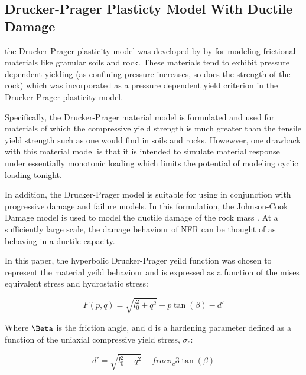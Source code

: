 \subsection{Drucker-Prager Plasticty Model With Ductile Damage}

the Drucker-Prager plasticity model was developed by by \citet{drucker_implications_1950} for modeling frictional materials like granular soils and rock. These materials tend  to exhibit pressure dependent yielding (as confining
pressure increases, so does the strength of the rock) which was incorporated as a pressure dependent yield criterion in the Drucker-Prager plasticity model. 

Specifically, the Drucker-Prager material model is formulated and used for materials of which the compressive yield strength is much greater than the tensile yield strength such as one would find in soils and rocks. Howewver, one drawback with this material model is that it is intended to simulate material response under essentially monotonic loading which limits the potential of modeling cyclic loading tonight.

In addition, the Drucker-Prager model is suitable for using in conjunction with progressive damage and failure models. In this formulation, the Johnson-Cook Damage model is used to model the ductile damage of the rock mass \cite{johnson_fracture_1985}. At a sufficiently large scale, the damage behaviour of NFR can be thought of as behaving in a ductile capacity. 




In this paper, the hyperbolic Drucker-Prager yeild function was chosen to represent the material yeild behaviour and is expressed as a function of the mises equivalent stress and hydrostatic stress:

\begin{equation}
F\left(p,q\right)=\sqrt{l_{0}^{2}+q^{2}}-p\tan\left(\beta\right)-d'\label{eqn:druc2}
\end{equation}

Where $\Beta$ is the friction angle, and d is a hardening parameter defined as a function of the uniaxial compressive yield stress, $\sigma_c$:

\begin{equation}
d'=\sqrt{l_{0}^{2}+q^{2}}-frac{\sigma_c}{3}\tan\left(\beta\right)
\label{eqn:druc2-2}
\end{equation}

